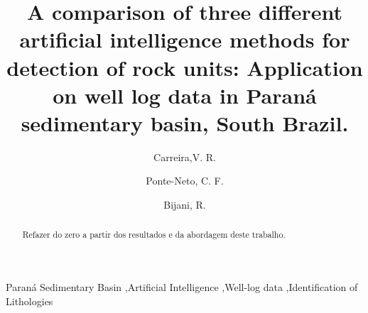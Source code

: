 \documentclass[preprint,12pt]{elsarticle}
\begin{document}
\begin{frontmatter}


 \author{Carreira,V. R. }

\title{A comparison of three different artificial intelligence methods for detection of rock units: Application on well log data in Paran\'a sedimentary basin, South Brazil.}

\author[label1]{Ponte-Neto, C. F. }
\address[label1]{Coordenacao de Geof\'isica, Observat\'orio Nacional (ON-MCTIC), Rio de Janeiro, Brasil}
\author[label2]{Bijani, R.}
\address[label2]{Departamento de Geologia e Geof\'isica, Universidade Federal Fluminense (UFF), Niter\'oi, Brasil}

\begin{abstract}
Refazer do zero a partir dos resultados e da abordagem deste trabalho.


\end{abstract}

\begin{keyword}
Paran\'a Sedimentary Basin \sep Artificial Intelligence \sep Well-log data \sep Identification of Lithologies 


\end{keyword}

\end{frontmatter}
\end{document}
